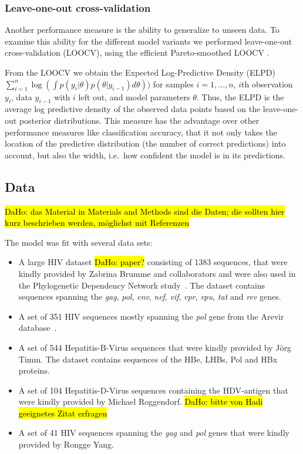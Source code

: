 \documentclass{bioinfo}
\begin{document}
\begin{methods}
\subsubsection{Leave-one-out cross-validation}

Another performance measure is the ability to generalize to unseen data. To examine this ability for the different model variants we performed leave-one-out cross-validation (LOOCV), using the efficient Pareto-smoothed LOOCV \cite{Vehtari2016}.

From the LOOCV we obtain the Expected Log-Predictive Density (ELPD) $\sum_{i=1}^{n}\log(\int p(y_i|\theta)p(\theta|y_{i-1})d\theta))$ for samples $i=1,\ldots,n$, $i$th observation $y_i$, data $y_{i-1}$ with $i$ left out, and model parameters $\theta$. Thus, the ELPD is the average log predictive density of the observed data points based on the leave-one-out posterior distributions. This measure has the advantage over other performance measures like classification accuracy, that it not only takes the location of the predictive distribution (the number of correct predictions) into account, but also the width, i.e.\ how confident the model is in its predictions.

  \subsection{Data}
 \hl{DaHo: das Material in Materials and Methods sind die Daten; die sollten hier kurz beschrieben werden, möglichst mit Referenzen}

The model was fit with several data sets:

\begin{itemize}
  \item A large HIV dataset \hl{DaHo: paper?} consisting of 1383 sequences, that were kindly provided by Zabrina Brumme and collaborators and were also used in the Phylogenetic Dependency Network study~\citep{Carlson2008}. The dataset contains sequences spanning the \textit{gag}, \textit{pol}, \textit{env}, \textit{nef}, \textit{vif}, \textit{vpr}, \textit{vpu}, \textit{tat} and \textit{rev} genes.
  \item A set of 351 HIV sequences mostly spanning the \textit{pol} gene from the Arevir database~\citep{Roomp2006}.
  \item A set of 544 Hepatitis-B-Virus sequences that were kindly provided by Jörg Timm. The dataset contains sequences of the HBe, LHBs, Pol and HBx proteins.
  \item A set of 104 Hepatitis-D-Virus sequences containing the HDV-antigen that were kindly provided by Michael Roggendorf. \hl{DaHo: bitte von Hadi geeignetes Zitat erfragen}
  \item A set of 41 HIV sequences spanning the \textit{gag} and \textit{pol} genes that were kindly provided by Rongge Yang. 
\end{itemize}


\end{methods}
\end{document}
